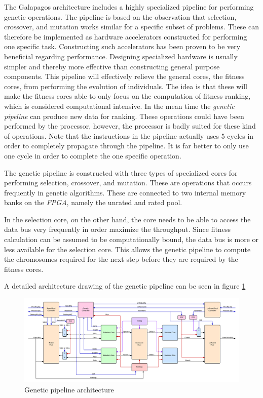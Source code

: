 The Galapagos architecture includes a highly specialized pipeline for performing genetic operations. The pipeline is based on the observation that selection, crossover, and mutation works similar for a specific subset of problems. These can therefore be implemented as hardware accelerators constructed for performing one specific task. Constructing such accelerators has been proven to be very beneficial regarding performance. Designing specialized hardware is usually simpler and thereby more effective than constructing general purpose components. This pipeline will effectively relieve the general cores, the fitness cores, from performing the evolution of individuals. The idea is that these will make the fitness cores able to only focus on the computation of fitness ranking, which is considered computational intensive. In the mean time the \emph{genetic pipeline} can produce new data for ranking. These operations could have been performed by the processor, however, the processor is badly suited for these kind of operations. Note that the instructions in the pipeline actually uses 5 cycles in order to completely propagate through the pipeline. It is far better to only use one cycle in order to complete the one specific operation.  

The genetic pipeline is constructed with three types of specialized cores for performing selection, crossover, and mutation. These are operations that occurs frequently in genetic algorithms. These are connected to two internal memory banks on the \emph{FPGA}, namely the unrated and rated pool.

In the selection core, on the other hand, the core needs to be able to access the data bus very frequently in order maximize the throughput.
Since fitness calculation can be assumed to be computationally bound, the data bus is more or less available for the selection core.
This allows the genetic pipeline to compute the chromosomes required for the next step before they are required by the fitness cores. 

A detailed architecture drawing of the genetic pipeline can be seen in figure \ref{fpga:fig:genetic:genetic_pipeline}

\begin{figure}

  \centering
  \includegraphics[width=\textwidth]{fpga/fig/genetic_pipeline.png}
  \caption{Genetic pipeline architecture}
  \label{fpga:fig:genetic:genetic_pipeline}
\end{figure}



